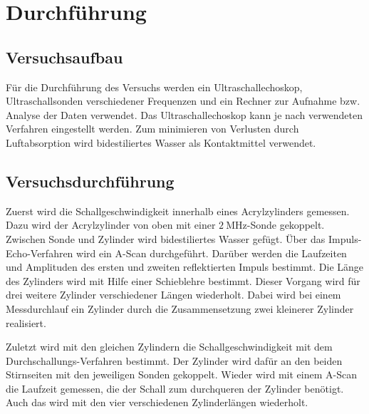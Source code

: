 \section{Durchführung}
\label{sec:Durchführung}

\subsection{Versuchsaufbau}
Für die Durchführung des Versuchs werden ein Ultraschallechoskop, Ultraschallsonden verschiedener Frequenzen und ein Rechner zur Aufnahme bzw. Analyse der Daten verwendet. Das Ultraschallechoskop kann je nach verwendeten Verfahren eingestellt werden. Zum minimieren von Verlusten durch Luftabsorption wird bidestiliertes Wasser als Kontaktmittel verwendet.

\subsection{Versuchsdurchführung}
Zuerst wird die Schallgeschwindigkeit innerhalb eines Acrylzylinders gemessen. Dazu wird der Acrylzylinder von oben mit einer $\SI{2}{\mega\hertz}$-Sonde gekoppelt. Zwischen Sonde und Zylinder wird bidestiliertes Wasser gefügt. Über das Impuls-Echo-Verfahren wird ein A-Scan durchgeführt. Darüber werden die Laufzeiten und Amplituden des ersten und zweiten reflektierten Impuls bestimmt. Die Länge des Zylinders wird mit Hilfe einer Schieblehre bestimmt. Dieser Vorgang wird für drei weitere Zylinder verschiedener Längen wiederholt. Dabei wird bei einem Messdurchlauf ein Zylinder durch die Zusammensetzung zwei kleinerer Zylinder realisiert. 

Zuletzt wird mit den gleichen Zylindern die Schallgeschwindigkeit mit dem Durchschallungs-Verfahren bestimmt. Der Zylinder wird dafür an den beiden Stirnseiten mit den jeweiligen Sonden gekoppelt. Wieder wird mit einem A-Scan die Laufzeit gemessen, die der Schall zum durchqueren der Zylinder benötigt. Auch das wird mit den vier verschiedenen Zylinderlängen wiederholt.


